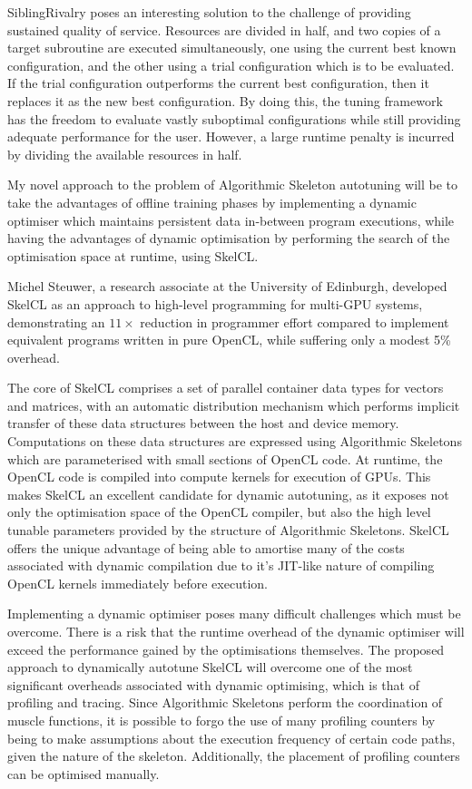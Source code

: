 SiblingRivalry poses an interesting solution to the challenge of
providing sustained quality of service. Resources are divided in half,
and two copies of a target subroutine are executed simultaneously, one
using the current best known configuration, and the other using a
trial configuration which is to be evaluated. If the trial
configuration outperforms the current best configuration, then it
replaces it as the new best configuration. By doing this, the tuning
framework has the freedom to evaluate vastly suboptimal configurations
while still providing adequate performance for the user. However, a
large runtime penalty is incurred by dividing the available resources
in half.

My novel approach to the problem of Algorithmic Skeleton autotuning
will be to take the advantages of offline training phases by
implementing a dynamic optimiser which maintains persistent data
in-between program executions, while having the advantages of dynamic
optimisation by performing the search of the optimisation space at
runtime, using SkelCL.

Michel Steuwer, a research associate at the University of Edinburgh,
developed SkelCL as an approach to high-level programming for
multi-GPU systems, demonstrating an $11\times$ reduction in programmer
effort compared to implement equivalent programs written in pure
OpenCL, while suffering only a modest 5\% overhead.

The core of SkelCL comprises a set of parallel container data types
for vectors and matrices, with an automatic distribution mechanism
which performs implicit transfer of these data structures between the
host and device memory. Computations on these data structures are
expressed using Algorithmic Skeletons which are parameterised with
small sections of OpenCL code. At runtime, the OpenCL code is compiled
into compute kernels for execution of GPUs. This makes SkelCL an
excellent candidate for dynamic autotuning, as it exposes not only the
optimisation space of the OpenCL compiler, but also the high level
tunable parameters provided by the structure of Algorithmic
Skeletons. SkelCL offers the unique advantage of being able to
amortise many of the costs associated with dynamic compilation due to
it's JIT-like nature of compiling OpenCL kernels immediately before
execution.

Implementing a dynamic optimiser poses many difficult challenges which
must be overcome. There is a risk that the runtime overhead of the
dynamic optimiser will exceed the performance gained by the
optimisations themselves. The proposed approach to dynamically
autotune SkelCL will overcome one of the most significant overheads
associated with dynamic optimising, which is that of profiling and
tracing. Since Algorithmic Skeletons perform the coordination of
muscle functions, it is possible to forgo the use of many profiling
counters by being to make assumptions about the execution frequency of
certain code paths, given the nature of the skeleton. Additionally,
the placement of profiling counters can be optimised manually.

